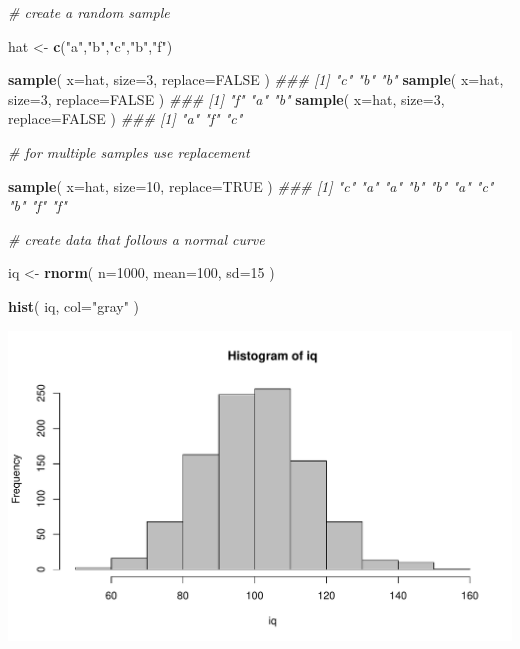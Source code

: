\documentclass[]{book}
\newenvironment{Shaded}{\begin{snugshade}}{\end{snugshade}}
\newcommand{\CommentTok}[1]{\textcolor[rgb]{0.56,0.35,0.01}{\textit{#1}}}
\newcommand{\DataTypeTok}[1]{\textcolor[rgb]{0.13,0.29,0.53}{#1}}
\newcommand{\DecValTok}[1]{\textcolor[rgb]{0.00,0.00,0.81}{#1}}
\newcommand{\KeywordTok}[1]{\textcolor[rgb]{0.13,0.29,0.53}{\textbf{#1}}}
\newcommand{\NormalTok}[1]{#1}
\newcommand{\OtherTok}[1]{\textcolor[rgb]{0.56,0.35,0.01}{#1}}
\newcommand{\StringTok}[1]{\textcolor[rgb]{0.31,0.60,0.02}{#1}}
\theoremstyle{definition}
\theoremstyle{definition}
\theoremstyle{definition}
\theoremstyle{remark}
\begin{document}
\begin{Shaded}
\begin{Highlighting}[]
\CommentTok{# create a random sample}

\NormalTok{hat <-}\StringTok{ }\KeywordTok{c}\NormalTok{(}\StringTok{"a"}\NormalTok{,}\StringTok{"b"}\NormalTok{,}\StringTok{"c"}\NormalTok{,}\StringTok{"b"}\NormalTok{,}\StringTok{"f"}\NormalTok{)}

\KeywordTok{sample}\NormalTok{( }\DataTypeTok{x=}\NormalTok{hat, }\DataTypeTok{size=}\DecValTok{3}\NormalTok{, }\DataTypeTok{replace=}\OtherTok{FALSE}\NormalTok{ )}
\CommentTok{### [1] "c" "b" "b"}
\KeywordTok{sample}\NormalTok{( }\DataTypeTok{x=}\NormalTok{hat, }\DataTypeTok{size=}\DecValTok{3}\NormalTok{, }\DataTypeTok{replace=}\OtherTok{FALSE}\NormalTok{ )}
\CommentTok{### [1] "f" "a" "b"}
\KeywordTok{sample}\NormalTok{( }\DataTypeTok{x=}\NormalTok{hat, }\DataTypeTok{size=}\DecValTok{3}\NormalTok{, }\DataTypeTok{replace=}\OtherTok{FALSE}\NormalTok{ )}
\CommentTok{### [1] "a" "f" "c"}

\CommentTok{# for multiple samples use replacement}

\KeywordTok{sample}\NormalTok{( }\DataTypeTok{x=}\NormalTok{hat, }\DataTypeTok{size=}\DecValTok{10}\NormalTok{, }\DataTypeTok{replace=}\OtherTok{TRUE}\NormalTok{ )}
\CommentTok{###  [1] "c" "a" "a" "b" "b" "a" "c" "b" "f" "f"}





\CommentTok{# create data that follows a normal curve}

\NormalTok{iq <-}\StringTok{ }\KeywordTok{rnorm}\NormalTok{( }\DataTypeTok{n=}\DecValTok{1000}\NormalTok{, }\DataTypeTok{mean=}\DecValTok{100}\NormalTok{, }\DataTypeTok{sd=}\DecValTok{15}\NormalTok{ )}

\KeywordTok{hist}\NormalTok{( iq, }\DataTypeTok{col=}\StringTok{"gray"}\NormalTok{ )}
\end{Highlighting}
\end{Shaded}

\begin{center}\includegraphics[width=0.7\linewidth]{DS4PS-I_files/figure-latex/unnamed-chunk-70-1} \end{center}
\end{document}
